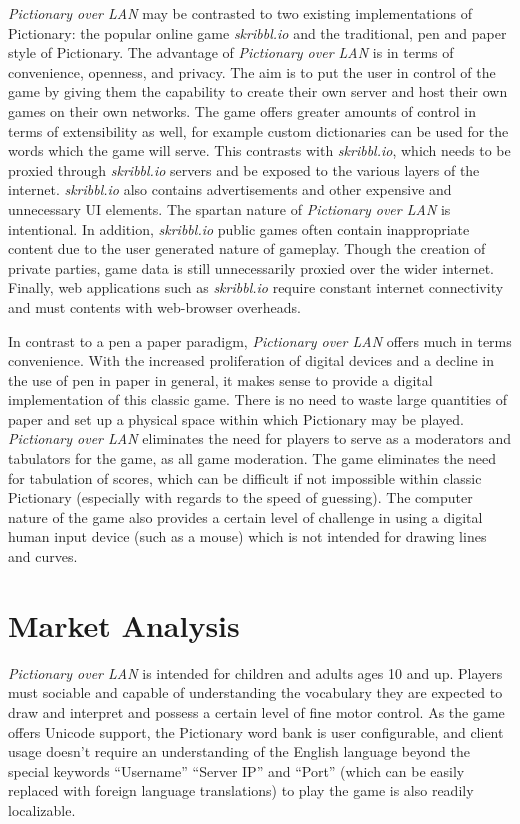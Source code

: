 \documentclass[12pt,letterpaper]{article}
\begin{document}
\textit{Pictionary over LAN} may be contrasted to two existing implementations of Pictionary: the popular online game \textit{skribbl.io} and the traditional, pen and paper style of Pictionary. The advantage of \textit{Pictionary over LAN} is in terms of convenience, openness, and privacy. The aim is to put the user in control of the game by giving them the capability to create their own server and host their own games on their own networks. The game offers greater amounts of control in terms of extensibility as well, for example custom dictionaries can be used for the words which the game will serve. This contrasts with \textit{skribbl.io}, which needs to be proxied through \textit{skribbl.io} servers and be exposed to the various layers of the internet. \textit{skribbl.io} also contains advertisements and other expensive and unnecessary UI elements. The spartan nature of \textit{Pictionary over LAN} is intentional. In addition, \textit{skribbl.io} public games often contain inappropriate content due to the user generated nature of gameplay. Though the creation of private parties, game data is still unnecessarily proxied over the wider internet. Finally, web applications such as \textit{skribbl.io} require constant internet connectivity and must contents with web-browser overheads.

In contrast to a pen a paper paradigm, \textit{Pictionary over LAN} offers much in terms convenience. With the increased proliferation of digital devices and a decline in the use of pen in paper in general, it makes sense to provide a digital implementation of this classic game. There is no need to waste large quantities of paper and set up a physical space within which Pictionary may be played. \textit{Pictionary over LAN} eliminates the need for players to serve as a moderators and tabulators for the game, as all game moderation. The game eliminates the need for tabulation of scores, which can be difficult if not impossible within classic Pictionary (especially with regards to the speed of guessing).  The computer nature of the game also provides a certain level of challenge in using a digital human input device (such as a mouse) which is not intended for drawing lines and curves.



\section*{Market Analysis}

\textit{Pictionary over LAN} is intended for children and adults ages 10 and up. Players must sociable and capable of understanding the vocabulary they are expected to draw and interpret and possess a certain level of fine motor control. As the game offers Unicode support, the Pictionary word bank is user configurable, and client usage  doesn’t require an understanding of the English language beyond the special keywords “Username” “Server IP” and “Port” (which can be easily replaced with foreign language translations) to play the game is also readily localizable.
\end{document}
